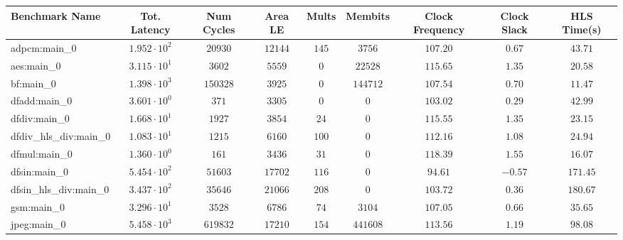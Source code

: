 \begin{tabular}{|l|c|c|c|c|c|c|c|c|}
\hline
Benchmark Name          & Tot. Latency           & Num Cycles  & Area LE    & Mults   & Membits    & Clock Frequency & Clock Slack & HLS Time(s) \\
\hline
adpcm:main\_0           & $ 1.952 \cdot 10^{2} $ & $ 20930   $ & $ 12144  $ & $ 145 $ & $ 3756   $ & $ 107.20      $ & $ 0.67    $ & $ 43.71   $ \\
aes:main\_0             & $ 3.115 \cdot 10^{1} $ & $ 3602    $ & $ 5559   $ & $ 0   $ & $ 22528  $ & $ 115.65      $ & $ 1.35    $ & $ 20.58   $ \\
bf:main\_0              & $ 1.398 \cdot 10^{3} $ & $ 150328  $ & $ 3925   $ & $ 0   $ & $ 144712 $ & $ 107.54      $ & $ 0.70    $ & $ 11.47   $ \\
dfadd:main\_0           & $ 3.601 \cdot 10^{0} $ & $ 371     $ & $ 3305   $ & $ 0   $ & $ 0      $ & $ 103.02      $ & $ 0.29    $ & $ 42.99   $ \\
dfdiv:main\_0           & $ 1.668 \cdot 10^{1} $ & $ 1927    $ & $ 3854   $ & $ 24  $ & $ 0      $ & $ 115.55      $ & $ 1.35    $ & $ 23.15   $ \\
dfdiv\_hls\_div:main\_0 & $ 1.083 \cdot 10^{1} $ & $ 1215    $ & $ 6160   $ & $ 100 $ & $ 0      $ & $ 112.16      $ & $ 1.08    $ & $ 24.94   $ \\
dfmul:main\_0           & $ 1.360 \cdot 10^{0} $ & $ 161     $ & $ 3436   $ & $ 31  $ & $ 0      $ & $ 118.39      $ & $ 1.55    $ & $ 16.07   $ \\
dfsin:main\_0           & $ 5.454 \cdot 10^{2} $ & $ 51603   $ & $ 17702  $ & $ 116 $ & $ 0      $ & $ 94.61       $ & $ -0.57   $ & $ 171.45  $ \\
dfsin\_hls\_div:main\_0 & $ 3.437 \cdot 10^{2} $ & $ 35646   $ & $ 21066  $ & $ 208 $ & $ 0      $ & $ 103.72      $ & $ 0.36    $ & $ 180.67  $ \\
gsm:main\_0             & $ 3.296 \cdot 10^{1} $ & $ 3528    $ & $ 6786   $ & $ 74  $ & $ 3104   $ & $ 107.05      $ & $ 0.66    $ & $ 35.65   $ \\
jpeg:main\_0            & $ 5.458 \cdot 10^{3} $ & $ 619832  $ & $ 17210  $ & $ 154 $ & $ 441608 $ & $ 113.56      $ & $ 1.19    $ & $ 98.08   $ \\

\end{tabular}

